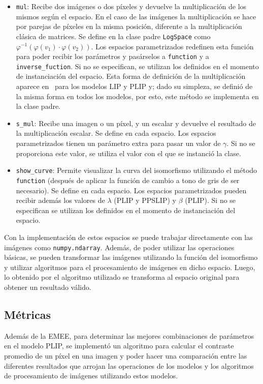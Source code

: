 \begin{itemize}
	\item \verb|mul|: Recibe dos im\'agenes o dos p\'ixeles y devuelve la multiplicaci\'on de los mismos seg\'un el espacio. En el caso de las im\'agenes la multiplicaci\'on se hace por parejas de p\'ixeles en la misma posici\'on, diferente a la multiplicaci\'on cl\'asica de matrices. Se define en la clase padre \verb|LogSpace| como $\varphi^{-1}(\varphi(v_1)\cdot\varphi(v_2))$. Los espacios parametrizados redefinen esta funci\'on para poder recibir los par\'ametros y pas\'arselos a \verb|function| y a \verb|inverse_fuction|. Si no se especifican, se utilizan los definidos en el momento de instanciaci\'on del espacio. Esta forma de definici\'on de la multiplicaci\'on aparece en~\cite{panetta2010parameterized} para los modelos LIP y PLIP y; dado su simpleza, se defini\'o de la misma forma en todos los modelos, por esto, este m\'etodo se implementa en la clase padre.
	\item \verb|s_mul|: Recibe una imagen o un p\'ixel, y un escalar y devuelve el resultado de la multiplicaci\'on escalar. Se define en cada espacio. Los espacios parametrizados tienen un par\'ametro extra para pasar un valor de $\gamma$. Si no se proporciona este valor, se utiliza el valor con el que se instanci\'o la clase.
	\item \verb|show_curve|: Permite visualizar la curva del isomorfismo utilizando el m\'etodo \verb|function| (despu\'es de aplicar la funci\'on de cambio a tono de gris de ser necesario). Se define en cada espacio. Los espacios parametrizados pueden recibir adem\'as los valores de $\lambda$ (PLIP y PPSLIP) y $\beta$ (PLIP). Si no se especifican se utilizan los definidos en el momento de instanciaci\'on del espacio.
\end{itemize}

Con la implementaci\'on de estos espacios se puede trabajar directamente con las im\'agenes como \verb|numpy.ndarray|. Adem\'as, de poder utilizar las operaciones b\'asicas, se pueden transformar las im\'agenes utilizando la funci\'on del isomorfismo y utilizar algoritmos para el procesamiento de im\'agenes en dicho espacio. Luego, lo obtenido por el algoritmo utilizado se transforma al espacio original para obtener un resultado v\'alido.

\subsection{M\'etricas}

Adem\'as de la EMEE, para determinar las mejores combinaciones de par\'ametros en el modelo PLIP, se implement\'o un algoritmo para calcular el contraste promedio de un p\'ixel en una imagen y poder hacer una comparaci\'on entre las diferentes resultados que arrojan las operaciones de los modelos y los algoritmos de procesamiento de im\'agenes utilizando estos modelos.

